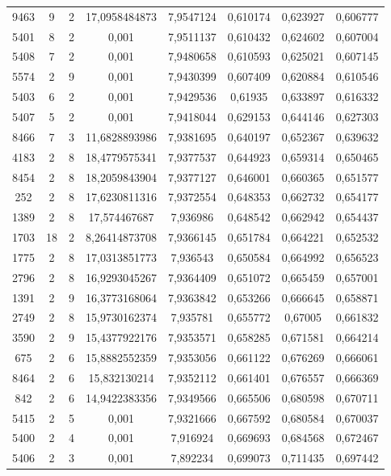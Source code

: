 \begin{longtable}{|c|c|c|c|c|c|c|c|}
9463 & 9 & 2 & 17,0958484873 & 7,9547124 & 0,610174 & 0,623927 & 0,606777 \\
5401 & 8 & 2 & 0,001 & 7,9511137 & 0,610432 & 0,624602 & 0,607004 \\
5408 & 7 & 2 & 0,001 & 7,9480658 & 0,610593 & 0,625021 & 0,607145 \\
5574 & 2 & 9 & 0,001 & 7,9430399 & 0,607409 & 0,620884 & 0,610546 \\
5403 & 6 & 2 & 0,001 & 7,9429536 & 0,61935 & 0,633897 & 0,616332 \\
5407 & 5 & 2 & 0,001 & 7,9418044 & 0,629153 & 0,644146 & 0,627303 \\
8466 & 7 & 3 & 11,6828893986 & 7,9381695 & 0,640197 & 0,652367 & 0,639632 \\
4183 & 2 & 8 & 18,4779575341 & 7,9377537 & 0,644923 & 0,659314 & 0,650465 \\
8454 & 2 & 8 & 18,2059843904 & 7,9377127 & 0,646001 & 0,660365 & 0,651577 \\
252 & 2 & 8 & 17,6230811316 & 7,9372554 & 0,648353 & 0,662732 & 0,654177 \\
1389 & 2 & 8 & 17,574467687 & 7,936986 & 0,648542 & 0,662942 & 0,654437 \\
1703 & 18 & 2 & 8,26414873708 & 7,9366145 & 0,651784 & 0,664221 & 0,652532 \\
1775 & 2 & 8 & 17,0313851773 & 7,936543 & 0,650584 & 0,664992 & 0,656523 \\
2796 & 2 & 8 & 16,9293045267 & 7,9364409 & 0,651072 & 0,665459 & 0,657001 \\
1391 & 2 & 9 & 16,3773168064 & 7,9363842 & 0,653266 & 0,666645 & 0,658871 \\
2749 & 2 & 8 & 15,9730162374 & 7,935781 & 0,655772 & 0,67005 & 0,661832 \\
3590 & 2 & 9 & 15,4377922176 & 7,9353571 & 0,658285 & 0,671581 & 0,664214 \\
675 & 2 & 6 & 15,8882552359 & 7,9353056 & 0,661122 & 0,676269 & 0,666061 \\
8464 & 2 & 6 & 15,832130214 & 7,9352112 & 0,661401 & 0,676557 & 0,666369 \\
842 & 2 & 6 & 14,9422383356 & 7,9349566 & 0,665506 & 0,680598 & 0,670711 \\
5415 & 2 & 5 & 0,001 & 7,9321666 & 0,667592 & 0,680584 & 0,670037 \\
5400 & 2 & 4 & 0,001 & 7,916924 & 0,669693 & 0,684568 & 0,672467 \\
5406 & 2 & 3 & 0,001 & 7,892234 & 0,699073 & 0,711435 & 0,697442 \\

\end{longtable}
